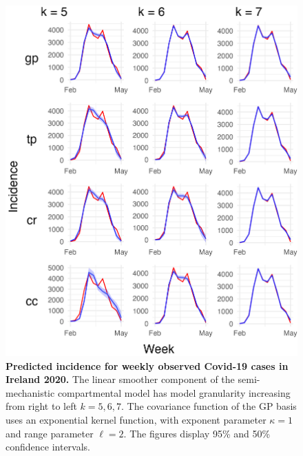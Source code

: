 \documentclass[
11pt, %
oneside, %
english, %
singlespacing, %
]{macthesis} %
\begin{document}
\begin{figure}[H]
\centering
\includegraphics[width=\textwidth, height = \textwidth]{figure/Ireland/Ireland_agg_k(5,6,7)_bsd1_beta1_gamma6_sd01_plot_incidence.png}
\caption[Predicted Covid-19 Incidence (2020)]{\textbf{Predicted incidence for weekly observed Covid-19 cases in Ireland 2020.} The linear smoother component of the semi-mechanistic compartmental model has model granularity increasing from right to left \(k= 5,6,7\). The covariance function of the GP basis uses an exponential kernel function, with exponent parameter \(\kappa = 1\) and range parameter \(\ell = 2\). The figures display 95\% and 50\% confidence intervals.}
\label{fig:ireland_inc}
\end{figure}
\end{document}
